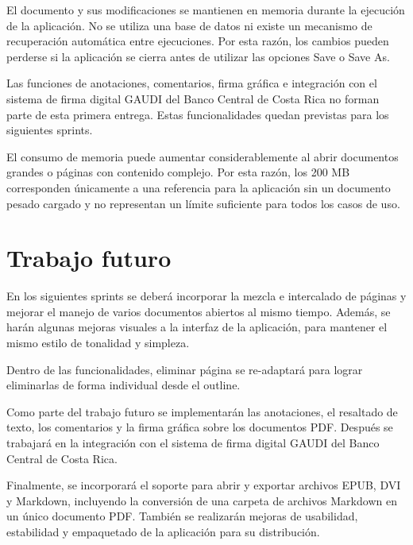El documento y sus modificaciones se mantienen en memoria durante la ejecución de la aplicación. No se utiliza una base de datos ni existe un mecanismo de recuperación automática entre ejecuciones. Por esta razón, los cambios pueden perderse si la aplicación se cierra antes de utilizar las opciones Save o Save As.

Las funciones de anotaciones, comentarios, firma gráfica e integración con el sistema de firma digital GAUDI del Banco Central de Costa Rica no forman parte de esta primera entrega. Estas funcionalidades quedan previstas para los siguientes sprints.

El consumo de memoria puede aumentar considerablemente al abrir documentos grandes o páginas con contenido complejo. Por esta razón, los 200 MB corresponden únicamente a una referencia para la aplicación sin un documento pesado cargado y no representan un límite suficiente para todos los casos de uso.


\section{Trabajo futuro}
En los siguientes sprints se deberá incorporar la mezcla e intercalado de páginas y mejorar el manejo de varios documentos abiertos al mismo tiempo. Además, se harán algunas mejoras visuales a la interfaz de la aplicación, para mantener el mismo estilo de tonalidad y simpleza.

Dentro de las funcionalidades, eliminar página se re-adaptará para lograr eliminarlas de forma individual desde el outline.

Como parte del trabajo futuro se implementarán las anotaciones, el resaltado de texto, los comentarios y la firma gráfica sobre los documentos PDF. Después se trabajará en la integración con el sistema de firma digital GAUDI del Banco Central de Costa Rica.

Finalmente, se incorporará el soporte para abrir y exportar archivos EPUB, DVI y Markdown, incluyendo la conversión de una carpeta de archivos Markdown en un único documento PDF. También se realizarán mejoras de usabilidad, estabilidad
y empaquetado de la aplicación para su distribución.





\cite{augmentedtext}
